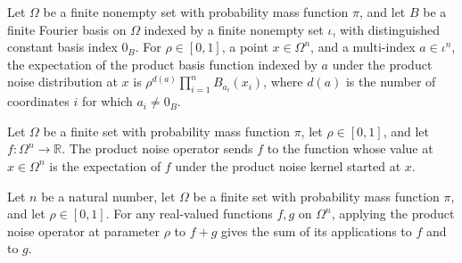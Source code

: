 \begin{theorem}
\label{FABL.FiniteFourierBasis.pmfExpectation_productNoiseKernel_productFunction}
\leanok
{}
Let $\Omega$ be a finite nonempty set with probability mass function $\pi$, and let $B$
be a finite Fourier basis on $\Omega$ indexed by a finite nonempty set $\iota$, with
distinguished constant basis index $0_B$. For $\rho\in[0,1]$, a point $x\in\Omega^n$,
and a multi-index $a\in\iota^n$, the expectation of the product basis function indexed
by $a$ under the product noise distribution at $x$ is $\rho^{d(a)}\prod_{i=1}^n
B_{a_i}(x_i)$, where $d(a)$ is the number of coordinates $i$ for which $a_i\ne 0_B$.
\end{theorem}

\begin{definition}
\label{FABL.productNoiseOperator}
\leanok
{}
Let $\Omega$ be a finite set with probability mass function $\pi$, let $\rho\in[0,1]$,
and let $f\colon\Omega^n\to\mathbb{R}$. The product noise operator sends $f$ to the
function whose value at $x\in\Omega^n$ is the expectation of $f$ under the product noise
kernel started at $x$.
\end{definition}

\begin{theorem}
\label{FABL.productNoiseOperator_add}
\leanok
{}
Let $n$ be a natural number, let $Ω$ be a finite set with probability mass function $π$,
and let $\rho\in[0,1]$. For any real-valued functions $f,g$ on $Ω^n$, applying the
product noise operator at parameter $\rho$ to $f+g$ gives the sum of its applications to
$f$ and to $g$.
\end{theorem}


